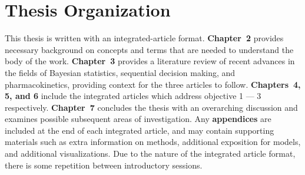 
\section{Thesis Organization}

This thesis is written with an integrated-article format.  \textbf{Chapter~2} provides necessary background on  concepts and terms that are needed to understand the body of the work.  \textbf{Chapter~3} provides a literature review of recent advances in the fields of Bayesian statistics, sequential decision making, and pharmacokinetics, providing context for the three articles to follow.  \textbf{Chapters~4, 5, and 6} include the integrated articles which address objective 1 --- 3 respectively.  \textbf{Chapter~7} concludes the thesis with an overarching discussion and examines possible subsequent areas of investigation.  Any \textbf{appendices} are included at the end of each integrated article, and may contain supporting materials such as extra information on methods, additional exposition for models, and additional visualizations.  Due to the nature of the integrated article format, there is some repetition between introductory sessions.